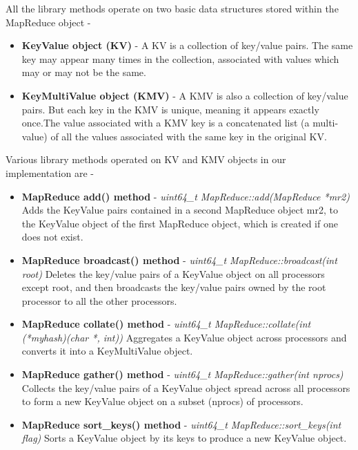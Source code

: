 \documentclass{article}
\begin{document}
    All the library methods operate on two basic data structures stored within the MapReduce object -
    \begin{itemize}
        \item
         \textbf{KeyValue object (KV)} - A KV is a collection of key/value pairs. The same key may appear many times in the collection, associated with values which may or may not be the same. 
        \item
        \textbf{KeyMultiValue object (KMV)} - A KMV is also a collection of key/value pairs. But each key in the KMV is unique, meaning it appears exactly once.The value associated with a KMV key is a concatenated list (a multi-value) of all the values associated with the same key in the original KV.
    \end{itemize}
     
     Various library methods operated on KV and KMV objects in our implementation are - 
     \begin{itemize}
         \item \textbf{MapReduce add() method} - \textit{uint64\_t MapReduce::add(MapReduce *mr2)} \newline
         Adds the KeyValue pairs contained in a second MapReduce object mr2, to the KeyValue object of the first MapReduce object, which is created if one does not exist. 
         
         \item \textbf{MapReduce broadcast() method} - \textit{uint64\_t MapReduce::broadcast(int root) } \newline
         Deletes the key/value pairs of a KeyValue object on all processors except root, and then broadcasts the key/value pairs owned by the root processor to all the other processors.
         
         \item \textbf{MapReduce collate() method} - \textit{uint64\_t MapReduce::collate(int (*myhash)(char *, int))  } \newline
         Aggregates a KeyValue object across processors and converts it into a KeyMultiValue object. 
         
         \item \textbf{MapReduce gather() method} - \textit{uint64\_t MapReduce::gather(int nprocs)  } \newline
         Collects the key/value pairs of a KeyValue object spread across all processors to form a new KeyValue object on a subset (nprocs) of processors. 
         
         \item \textbf{MapReduce sort\_keys() method} - \textit{uint64\_t MapReduce::sort\_keys(int flag)   } \newline
         Sorts a KeyValue object by its keys to produce a new KeyValue object. 
         
     \end{itemize}
    
\end{document}
